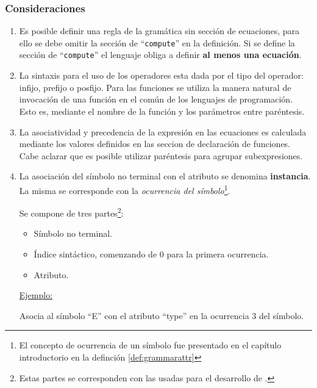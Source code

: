 \subsubsection*{Consideraciones}
\label{subsec:consirule}
\begin{enumerate}
\item Es posible definir una regla de la gramática sin sección de ecuaciones, para ello se debe omitir la sección de ``\texttt{compute}'' en la definición. Si se define la sección de ``\texttt{compute}'' el lenguaje obliga a definir \textbf{al menos una ecuación}.

\item La sintaxis para el uso de los operadores esta dada por el tipo del operador: infijo, prefijo o posfijo. Para las funciones se utiliza la manera natural de invocación de una función en el común de los lenguajes de programación. Esto es, mediante el nombre de la función y los parámetros entre paréntesis.

\item La asociatividad y precedencia de la expresión en las ecuaciones es calculada mediante los valores definidos en las seccion de declaración de funciones. Cabe aclarar que es posible utilizar paréntesis para agrupar subexpresiones.

\item La asociación del símbolo no terminal con el atributo se denomina \textbf{instancia}. La misma se corresponde con la \textit{ocurrencia del símbolo}\footnote{El concepto de ocurrencia de un símbolo fue presentado en el capítulo introductorio en la definción \ref{def:grammarattr}}. 

Se compone de tres partes\footnote{Estas partes se corresponden con las usadas para el desarrollo de \maggen.}:
\begin{itemize}
\item Símbolo no terminal.
\item Índice sintáctico, comenzando de 0 para la primera ocurrencia.
\item Atributo.
\end{itemize}
\begin{center} \underline{Ejemplo:}\  
\end{center} 

Asocia al símbolo ``E'' con el atributo ``type'' en la ocurrencia 3 del símbolo.

\end{enumerate}

